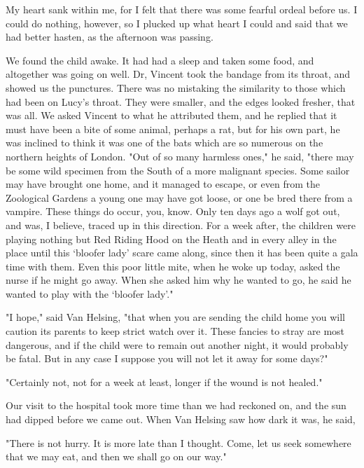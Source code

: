 My heart sank within me, for I felt that there was some fearful ordeal before us. I could do nothing, however, so I plucked up what heart I could and said that we had better hasten, as the afternoon was passing. 

We found the child awake. It had had a sleep and taken some food, and altogether was going on well. Dr, Vincent took the bandage from its throat, and showed us the punctures. There was no mistaking the similarity to those which had been on Lucy's throat. They were smaller, and the edges looked fresher, that was all. We asked Vincent to what he attributed them, and he replied that it must have been a bite of some animal, perhaps a rat, but for his own part, he was inclined to think it was one of the bats which are so numerous on the northern heights of London. "Out of so many harmless ones," he said, "there may be some wild specimen from the South of a more malignant species. Some sailor may have brought one home, and it managed to escape, or even from the Zoological Gardens a young one may have got loose, or one be bred there from a vampire. These things do occur, you, know. Only ten days ago a wolf got out, and was, I believe, traced up in this direction. For a week after, the children were playing nothing but Red Riding Hood on the Heath and in every alley in the place until this `bloofer lady' scare came along, since then it has been quite a gala time with them. Even this poor little mite, when he woke up today, asked the nurse if he might go away. When she asked him why he wanted to go, he said he wanted to play with the `bloofer lady'." 

"I hope," said Van Helsing, "that when you are sending the child home you will caution its parents to keep strict watch over it. These fancies to stray are most dangerous, and if the child were to remain out another night, it would probably be fatal. But in any case I suppose you will not let it away for some days?" 

"Certainly not, not for a week at least, longer if the wound is not healed." 

Our visit to the hospital took more time than we had reckoned on, and the sun had dipped before we came out. When Van Helsing saw how dark it was, he said, 

"There is not hurry. It is more late than I thought. Come, let us seek somewhere that we may eat, and then we shall go on our way." 

